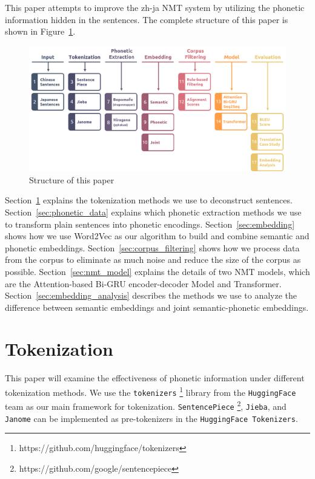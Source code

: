 \hspace{24pt}

This paper attempts to improve the zh-ja NMT system by utilizing the phonetic information hidden in the sentences. The complete structure of this paper is shown in Figure~\ref{fig:structure}.

\begin{figure}[h]
	\centering
	\includegraphics[scale=0.48]{../images/structure.png}
    \caption{Structure of this paper}
	\label{fig:structure}
\end{figure}

Section~\ref{sec:tokenization} explains the tokenization methods we use to deconstruct sentences. Section~\ref{sec:phonetic_data} explains which phonetic extraction methods we use to transform plain sentences into phonetic encodings. Section~\ref{sec:embedding} shows how we use Word2Vec as our algorithm to build and combine semantic and phonetic embeddings. Section~\ref{sec:corpus_filtering} shows how we process data from the corpus to eliminate as much noise and reduce the size of the corpus as possible. Section~\ref{sec:nmt_model} explains the details of two NMT models, which are the Attention-based Bi-GRU encoder-decoder Model and Transformer. Section~\ref{sec:embedding_analysis} describes the methods we use to analyze the difference between semantic embeddings and joint semantic-phonetic embeddings.

\section{Tokenization} \label{sec:tokenization}

This paper will examine the effectiveness of phonetic information under different tokenization methods. We use the \texttt{tokenizers} \footnote{https://github.com/huggingface/tokenizers} library from the \texttt{HuggingFace} team as our main framework for tokenization. \texttt{SentencePiece} \footnote{https://github.com/google/sentencepiece}, \texttt{Jieba}, and \texttt{Janome} can be implemented as pre-tokenizers in the \texttt{HuggingFace Tokenizers}.


